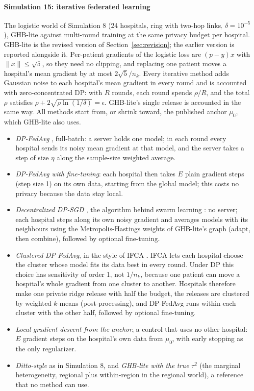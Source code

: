 \documentclass[acmsmall,screen,nonacm]{acmart}
\theoremstyle{acmdefinition}
\begin{document}
\paragraph{Simulation 15: iterative federated learning} The logistic world of Simulation 8 (24 hospitals, ring with two-hop links, $\delta=10^{-5}$), GHB-lite against multi-round training at the same privacy budget per hospital. GHB-lite is the revised version of Section~\ref{sec:revision}; the earlier version is reported alongside it. Per-patient gradients of the logistic loss are $(p-y)x$ with $\|x\|\le\sqrt{5}$, so they need no clipping, and replacing one patient moves a hospital's mean gradient by at most $2\sqrt{5}/n_k$. Every iterative method adds Gaussian noise to each hospital's mean gradient in every round and is accounted with zero-concentrated DP: with $R$ rounds, each round spends $\rho/R$, and the total $\rho$ satisfies $\rho+2\sqrt{\rho\ln(1/\delta)}=\epsilon$. GHB-lite's single release is accounted in the same way. All methods start from, or shrink toward, the published anchor $\mu_0$, which GHB-lite also uses.
\begin{itemize}[leftmargin=*,itemsep=1pt]
\item \emph{DP-FedAvg} \cite{mcmahan2017communication,mcmahan2018learning}, full-batch: a server holds one model; in each round every hospital sends its noisy mean gradient at that model, and the server takes a step of size $\eta$ along the sample-size weighted average.
\item \emph{DP-FedAvg \cite{mcmahan2018learning} with fine-tuning}: each hospital then takes $E$ plain gradient steps (step size 1) on its own data, starting from the global model; this costs no privacy because the data stay local.
\item \emph{Decentralized DP-SGD} \cite{lian2017can}, the algorithm behind swarm learning \cite{warnatherresthal2021swarm}: no server; each hospital steps along its own noisy gradient and averages models with its neighbours using the Metropolis-Hastings weights of GHB-lite's graph (adapt, then combine), followed by optional fine-tuning.
\item \emph{Clustered DP-FedAvg}, in the style of IFCA \cite{ghosh2020efficient}. IFCA \cite{ghosh2020efficient} lets each hospital choose the cluster whose model fits its data best in every round. Under DP this choice has sensitivity of order 1, not $1/n_k$, because one patient can move a hospital's whole gradient from one cluster to another. Hospitals therefore make one private ridge release with half the budget, the releases are clustered by weighted $k$-means (post-processing), and DP-FedAvg \cite{mcmahan2018learning} runs within each cluster with the other half, followed by optional fine-tuning.
\item \emph{Local gradient descent from the anchor}, a control that uses no other hospital: $E$ gradient steps on the hospital's own data from $\mu_0$, with early stopping as the only regularizer.
\item \emph{Ditto-style \cite{li2021ditto}} as in Simulation 8, and \emph{GHB-lite with the true $\tau^2$} (the marginal heterogeneity, regional plus within-region in the regional world), a reference that no method can use.
\end{itemize}
\end{document}
